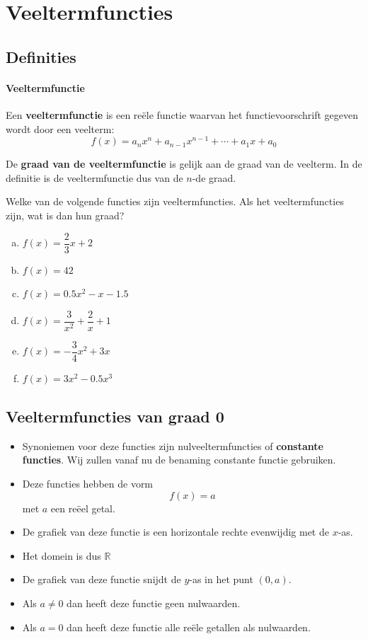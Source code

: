 \documentclass[12pt]{article}
\begin{document}
\newpage

\section{Veeltermfuncties}

\subsection{Definities}

\paragraph*{Veeltermfunctie}
\begin{mdframed}
Een {\bf veeltermfunctie} is een reële functie waarvan het functievoorschrift gegeven wordt door een veelterm:
$$f(x)= a_nx^n + a_{n-1}x^{n-1} + \cdots + a_1x + a_0$$
\end{mdframed}

De {\bf graad van de veeltermfunctie} is gelijk aan de graad van de veelterm. In de definitie is de veeltermfunctie dus van de $n$-de graad.

\begin{oefening}
Welke van de volgende functies zijn veeltermfuncties. Als het veeltermfuncties zijn, wat is dan hun graad?
\begin{enumerate}[(a)]
  \itemsep1em
  \item $f(x)=\dfrac{2}{3}x+2$
  \item $f(x)=42$
  \item $f(x)=0.5x^2-x-1.5$
  \item $f(x)=\dfrac{3}{x^2}+\dfrac{2}{x}+1$
  \item $f(x)=-\dfrac{3}{4}x^2+3x$
  \item $f(x)=3x^2-0.5x^3$
\end{enumerate}
\end{oefening}

\subsection{Veeltermfuncties van graad 0}

\begin{itemize}
  \item Synoniemen voor deze functies zijn nulveeltermfuncties of {\bf constante functies}. Wij zullen vanaf nu de benaming constante functie gebruiken.
  \item Deze functies hebben de vorm
  $$f(x) = a$$
  met $a$ een reëel getal.
  \item De grafiek van deze functie is een horizontale rechte evenwijdig met de $x$-as.
  \item Het domein is dus $\mathbb{R}$
  \item De grafiek van deze functie snijdt de $y$-as in het punt $(0, a)$.
  \item Als $a\neq 0$ dan heeft deze functie geen nulwaarden.
  \item Als $a=0$ dan heeft deze functie alle reële getallen als nulwaarden.
\end{itemize}
\end{document}
